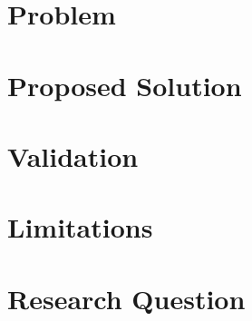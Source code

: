 \documentclass{article}
\title{}
\author{Blake Bartenbach}
\date{October 2021}
\begin{document}
\maketitle

\section{Problem}

\section{Proposed Solution}

\section{Validation}

\section{Limitations}

\section{Research Question}



\end{document}
